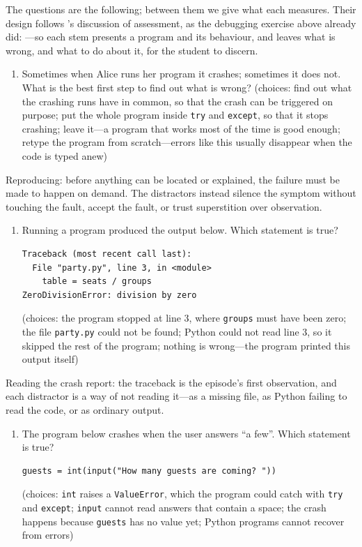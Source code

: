 The questions are the following; between them we give what each
measures.
Their design follows \citeauthor{NCOL}'s discussion of assessment, as
the debugging exercise above already did:
---so each stem
presents a program and its behaviour, and leaves what is wrong, and
what to do about it, for the student to discern.
\begin{enumerate}[series=knowledgequiz]
  \item Sometimes when Alice runs her program it crashes; sometimes it
    does not.
    What is the best first step to find out what is wrong?
    (choices: find out what the crashing runs have in common, so that
    the crash can be triggered on purpose; put the whole program inside
    \texttt{try} and \texttt{except}, so that
    it stops crashing; leave it---a program that works most of the time
    is good enough; retype the program from scratch---errors like this
    usually disappear when the code is typed anew)
\end{enumerate}
Reproducing: before anything can be located or explained, the failure
must be made to happen on demand.
The distractors instead silence the symptom without touching the fault,
accept the fault, or trust superstition over observation.
\begin{enumerate}[resume*=knowledgequiz]
  \item Running a program produced the output below.
    Which statement is true?
\begin{verbatim}
Traceback (most recent call last):
  File "party.py", line 3, in <module>
    table = seats / groups
ZeroDivisionError: division by zero
\end{verbatim}
    (choices: the program stopped at line 3, where
    \texttt{groups} must have been zero; the file
    \texttt{party.py} could not be found; Python could not read line 3,
    so it skipped the rest of the program; nothing is wrong---the
    program printed this output itself)
\end{enumerate}
Reading the crash report: the traceback is the episode's first
observation, and each distractor is a way of not reading it---as a
missing file, as Python failing to read the code, or as ordinary
output.
\begin{enumerate}[resume*=knowledgequiz]
  \item The program below crashes when the user answers
    \enquote{a few}.
    Which statement is true?
\begin{verbatim}
guests = int(input("How many guests are coming? "))
\end{verbatim}
    (choices: \texttt{int} raises a
    \texttt{ValueError}, which the program could catch
    with \texttt{try} and \texttt{except};
    \texttt{input} cannot read answers that contain a
    space; the crash happens because \texttt{guests} has
    no value yet; Python programs cannot recover from errors)
\end{enumerate}
